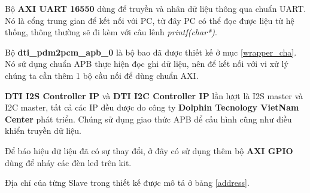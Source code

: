 Bộ \textbf{AXI UART 16550} dùng để truyền và nhân dữ liệu thông qua chuẩn UART. Nó là cổng trung gian để kết nối với PC, từ đây PC có thể đọc được liệu từ hệ thống, thông thường sẽ đi kèm với câu lênh \textit{printf(char*)}.

Bộ \textbf{dti\_pdm2pcm\_apb\_0} là bộ bao đã được thiết kế ở mục \ref{wrapper_cha}. Nó sử dụng chuẩn APB thực hiện đọc ghi dữ liệu, nên để kết nối với vi xử lý chúng ta cần thêm 1 bộ cầu nối để dùng chuẩn AXI.

\textbf{DTI I2S Controller IP} và \textbf{DTI I2C Controller IP} lần lượt là I2S master và I2C master, tất cả các IP đều được do công ty \textbf{Dolphin Tecnology VietNam Center} phát triển. Chúng sử dụng giao thức APB để cấu hình cũng như điều khiển truyền dữ liệu.

Để báo hiệu dữ liệu đã có sự thay đổi, ở đây có sử dụng thêm bộ \textbf{AXI GPIO} dùng để nháy các đèn led trên kit.

Địa chỉ của từng Slave trong thiết kế được mô tả ở bảng \ref{address}.

